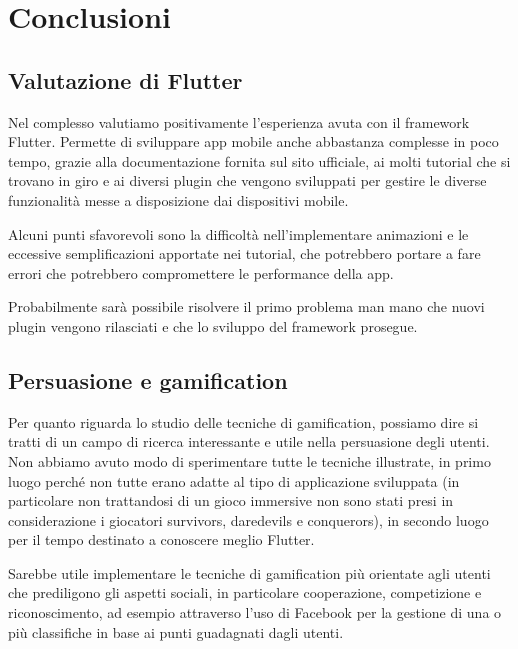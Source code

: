 \chapter{Conclusioni\label{sec:conclusioni}}

\section{Valutazione di Flutter\label{sec:valutazione-flutter}}
Nel complesso valutiamo positivamente l'esperienza avuta con il framework Flutter.
Permette di sviluppare app mobile anche abbastanza complesse in poco tempo, grazie alla documentazione fornita sul sito ufficiale, ai molti tutorial che si trovano in giro e ai diversi plugin che vengono sviluppati per gestire le diverse funzionalità messe a disposizione dai dispositivi mobile.

Alcuni punti sfavorevoli sono la difficoltà nell'implementare animazioni e le eccessive semplificazioni apportate nei tutorial, che potrebbero portare a fare errori che potrebbero compromettere le performance della app.

Probabilmente sarà possibile risolvere il primo problema man mano che nuovi plugin vengono rilasciati e che lo sviluppo del framework prosegue.

\section{Persuasione e gamification\label{sec:persuasione-gamification}}
Per quanto riguarda lo studio delle tecniche di gamification, possiamo dire si tratti di un campo di ricerca interessante e utile nella persuasione degli utenti.
Non abbiamo avuto modo di sperimentare tutte le tecniche illustrate, in primo luogo perché non tutte erano adatte al tipo di applicazione sviluppata (in particolare non trattandosi di un gioco immersive non sono stati presi in considerazione i giocatori survivors, daredevils e conquerors), in secondo luogo per il tempo destinato a conoscere meglio Flutter.

Sarebbe utile implementare le tecniche di gamification più orientate agli utenti che prediligono gli aspetti sociali, in particolare cooperazione, competizione e riconoscimento, ad esempio attraverso l'uso di Facebook per la gestione di una o più classifiche in base ai punti guadagnati dagli utenti.